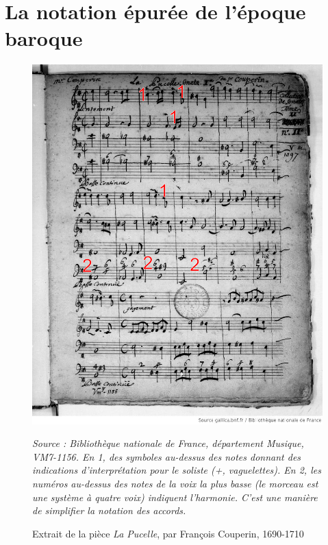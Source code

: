 \section{La notation épurée de l'époque baroque}
\label{sec:exempleMusiqueBaroque}
\begin{figure}[H]
	\centering
	\includegraphics[keepaspectratio=true, width=\textwidth]{Annexes/i/exempleMusiqueBaroque.jpeg}
	\caption{Extrait de la pièce \textit{La Pucelle}, par François Couperin, 1690-1710}
	\medskip
	\small
	\it
	Source : Bibliothèque nationale de France, département Musique, VM7-1156.
	En 1, des symboles au-dessus des notes donnant des indications d'interprétation pour le soliste (+, vaguelettes). En 2, les numéros au-dessus des notes de la voix la plus basse (le morceau est une système à quatre voix) indiquent l'harmonie. C'est une manière de simplifier la notation des accords. 	
	\label{fig:exempleMusiqueBaroque}
\end{figure}
\clearpage

